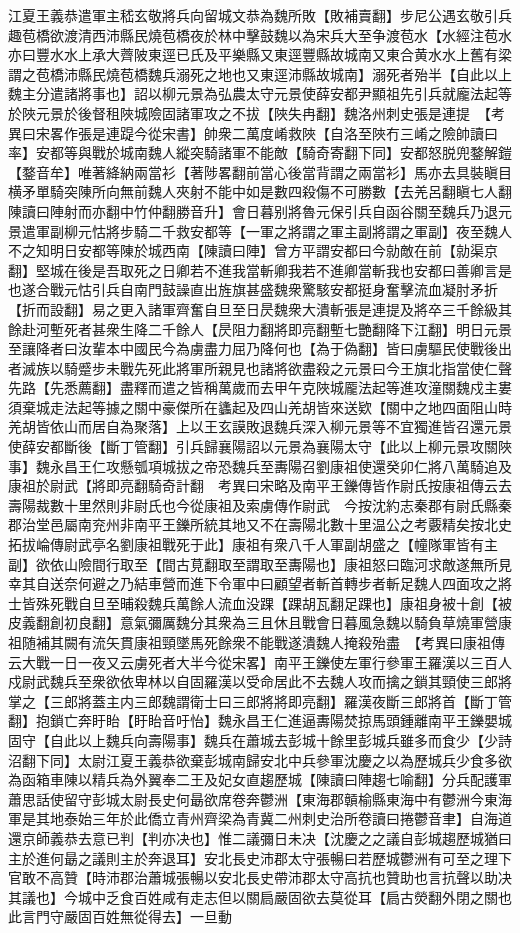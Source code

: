 江夏王義恭遣軍主嵇玄敬將兵向留城文恭為魏所敗【敗補賣翻】步尼公遇玄敬引兵趣苞橋欲渡清西沛縣民燒苞橋夜於林中擊鼓魏以為宋兵大至争渡苞水【水經注苞水亦曰豐水水上承大薺陂東逕已氏及平樂縣又東逕豐縣故城南又東合黄水水上舊有梁謂之苞橋沛縣民燒苞橋魏兵溺死之地也又東逕沛縣故城南】溺死者殆半【自此以上魏主分遣諸將事也】詔以柳元景為弘農太守元景使薛安都尹顯祖先引兵就龐法起等於陜元景於後督租陜城險固諸軍攻之不拔【陜失冉翻】魏洛州刺史張是連提　【考異曰宋畧作張是連踶今從宋書】帥衆二萬度崤救陜【自洛至陜冇三崤之險帥讀曰率】安都等與戰於城南魏人縱突騎諸軍不能敵【騎奇寄翻下同】安都怒脱兜鍪解鎧【鍪音牟】唯著絳納兩當衫【著陟畧翻前當心後當背謂之兩當衫】馬亦去具裝瞋目横矛單騎突陳所向無前魏人夾射不能中如是數四殺傷不可勝數【去羌呂翻瞋七人翻陳讀曰陣射而亦翻中竹仲翻勝音升】會日暮别將魯元保引兵自函谷關至魏兵乃退元景遣軍副柳元怙將步騎二千救安都等【一軍之將謂之軍主副將謂之軍副】夜至魏人不之知明日安都等陳於城西南【陳讀曰陣】曾方平謂安都曰今勍敵在前【勍渠京翻】堅城在後是吾取死之日卿若不進我當斬卿我若不進卿當斬我也安都曰善卿言是也遂合戰元怙引兵自南門鼓譟直出旌旗甚盛魏衆驚駭安都挺身奮擊流血凝肘矛折【折而設翻】易之更入諸軍齊奮自旦至日昃魏衆大潰斬張是連提及將卒三千餘級其餘赴河塹死者甚衆生降二千餘人【昃阻力翻將即亮翻塹七艷翻降下江翻】明日元景至讓降者曰汝輩本中國民今為虜盡力屈乃降何也【為于偽翻】皆曰虜驅民使戰後出者滅族以騎蹙步未戰先死此將軍所親見也諸將欲盡殺之元景曰今王旗北指當使仁聲先路【先悉薦翻】盡釋而遣之皆稱萬歲而去甲午克陜城龎法起等進攻潼關魏戍主婁須棄城走法起等據之關中豪傑所在蠭起及四山羌胡皆來送欵【關中之地四面阻山時羌胡皆依山而居自為聚落】上以王玄謨敗退魏兵深入柳元景等不宜獨進皆召還元景使薛安都斷後【斷丁管翻】引兵歸襄陽詔以元景為襄陽太守【此以上柳元景攻關陜事】魏永昌王仁攻懸瓠項城拔之帝恐魏兵至夀陽召劉康祖使還癸卯仁將八萬騎追及康祖於尉武【將即亮翻騎奇計翻　考異曰宋略及南平王鑠傳皆作尉氏按康祖傳云去壽陽裁數十里然則非尉氏也今從康祖及索虜傳作尉武　今按沈約志秦郡有尉氏縣秦郡治堂邑屬南兖州非南平王鑠所統其地又不在壽陽北數十里温公之考覈精矣按北史拓拔崘傳尉武亭名劉康祖戰死于此】康祖有衆八千人軍副胡盛之【幢隊軍皆有主副】欲依山險間行取至【間古莧翻取至謂取至夀陽也】康祖怒曰臨河求敵遂無所見幸其自送奈何避之乃結車營而進下令軍中曰顧望者斬首轉步者斬足魏人四面攻之將士皆殊死戰自旦至晡殺魏兵萬餘人流血没踝【踝胡瓦翻足踝也】康祖身被十創【被皮義翻創初良翻】意氣彌厲魏分其衆為三且休且戰會日暮風急魏以騎負草燒軍營康祖随補其闕有流矢貫康祖頸墜馬死餘衆不能戰遂潰魏人掩殺殆盡　【考異曰康祖傳云大戰一日一夜又云虜死者大半今從宋畧】南平王鑠使左軍行參軍王羅漢以三百人戍尉武魏兵至衆欲依卑林以自固羅漢以受命居此不去魏人攻而擒之鎖其頸使三郎將掌之【三郎將蓋主内三郎魏謂衛士曰三郎將將即亮翻】羅漢夜斷三郎將首【斷丁管翻】抱鎖亡奔盱眙【盱眙音吁怡】魏永昌王仁進逼夀陽焚掠馬頭鍾離南平王鑠嬰城固守【自此以上魏兵向壽陽事】魏兵在蕭城去彭城十餘里彭城兵雖多而食少【少詩沼翻下同】太尉江夏王義恭欲棄彭城南歸安北中兵參軍沈慶之以為歷城兵少食多欲為函箱車陳以精兵為外翼奉二王及妃女直趨歷城【陳讀曰陣趨七喻翻】分兵配護軍蕭思話使留守彭城太尉長史何朂欲席卷奔鬱洲【東海郡贑榆縣東海中有鬱洲今東海軍是其地泰始三年於此僑立青州齊梁為青冀二州刺史治所卷讀曰捲鬱音聿】自海道還京師義恭去意已判【判亦决也】惟二議彌日未决【沈慶之之議自彭城趨歷城猶曰主於進何朂之議則主於奔退耳】安北長史沛郡太守張暢曰若歷城鬱洲有可至之理下官敢不高贊【時沛郡治蕭城張暢以安北長史帶沛郡太守高抗也贊助也言抗聲以助决其議也】今城中乏食百姓咸有走志但以關扃嚴固欲去莫從耳【扃古熒翻外閉之關也此言門守嚴固百姓無從得去】一旦動